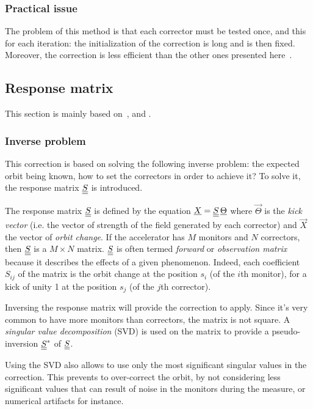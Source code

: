 \subsubsection{Practical issue}
The problem of this method is that each corrector must be tested once, and this for each iteration: the initialization of the correction is long and is then fixed. Moreover, the correction is less efficient than the other ones presented here~\cite{book:wille}.

\subsection{Response matrix}
\label{sec:response_matrix}
This section is mainly based on~\cite{book:wille}, \cite{art:decker-1991} and \cite{art:plouviez-1999}.

\subsubsection{Inverse problem}
This correction is based on solving the following inverse problem: the expected orbit being known, how to set the correctors in order to achieve it? To solve it, the response matrix $\underline{\underline{S}}$ is introduced.

The response matrix $\underline{\underline{S}}$ is defined by the equation $\underline{X} = \underline{\underline{S}}\, \underline{\Theta}$ where $\vec{\Theta}$ is the \emph{kick vector} (i.e. the vector of strength of the field generated by each corrector) and $\vec{X}$ the vector of \emph{orbit change}. If the accelerator has $M$ monitors and $N$ correctors, then $\underline{\underline{S}}$ is a $M \times N$ matrix. $\underline{\underline{S}}$ is often termed \emph{forward} or \emph{observation matrix} because it describes the effects of a given phenomenon. Indeed, each coefficient $S_{ij}$ of the matrix is the orbit change at the position $s_i$ (of the $i$th monitor), for a kick of unity 1 at the position $s_j$ (of the $j$th corrector).

Inversing the response matrix will provide the correction to apply. Since it's very common to have more monitors than correctors, the matrix is not square. A \emph{singular value decomposition} (SVD) is used on the matrix to provide a pseudo-inversion $\underline{\underline{S}}^*$ of $\underline{\underline{S}}$.

Using the SVD also allows to use only the most significant singular values in the correction. This prevents to over-correct the orbit, by not considering less significant values that can result of noise in the monitors during the measure, or numerical artifacts for instance.

